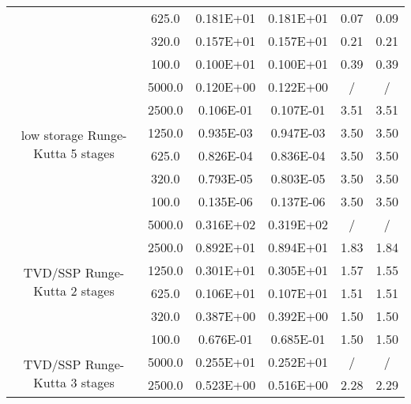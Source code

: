 \documentclass[pdftex,preprint,3p,times,numbers]{elsarticle}
\begin{document}
\begin{table}[!ht]
{\begin{tabular}{cccccc}
                 &    625.0        &  0.181E+01    &  0.181E+01     & 0.07         & 0.09          \\
                 &    320.0        &  0.157E+01    &  0.157E+01     & 0.21         & 0.21          \\
                 &    100.0        &  0.100E+01    &  0.100E+01     & 0.39         & 0.39          \\
    \cmidrule{2-6}
    \multirow{6}{*}{low storage Runge-Kutta 5 stages}
                 &   5000.0        &  0.120E+00    &  0.122E+00     & /            & /             \\
                 &   2500.0        &  0.106E-01    &  0.107E-01     & 3.51         & 3.51          \\
                 &   1250.0        &  0.935E-03    &  0.947E-03     & 3.50         & 3.50          \\
                 &    625.0        &  0.826E-04    &  0.836E-04     & 3.50         & 3.50          \\
                 &    320.0        &  0.793E-05    &  0.803E-05     & 3.50         & 3.50          \\
                 &    100.0        &  0.135E-06    &  0.137E-06     & 3.50         & 3.50          \\
    \cmidrule{2-6}
    \multirow{6}{*}{TVD/SSP Runge-Kutta 2 stages}
                 &   5000.0        &  0.316E+02    &  0.319E+02     & /            & /             \\
                 &   2500.0        &  0.892E+01    &  0.894E+01     & 1.83         & 1.84          \\
                 &   1250.0        &  0.301E+01    &  0.305E+01     & 1.57         & 1.55          \\
                 &    625.0        &  0.106E+01    &  0.107E+01     & 1.51         & 1.51          \\
                 &    320.0        &  0.387E+00    &  0.392E+00     & 1.50         & 1.50          \\
                 &    100.0        &  0.676E-01    &  0.685E-01     & 1.50         & 1.50          \\
    \cmidrule{2-6}
    \multirow{6}{*}{TVD/SSP Runge-Kutta 3 stages}
                 &   5000.0        &  0.255E+01    &  0.252E+01     & /            & /             \\
                 &   2500.0        &  0.523E+00    &  0.516E+00     & 2.28         & 2.29          \\

\end{tabular}}
\end{table}
\end{document}
